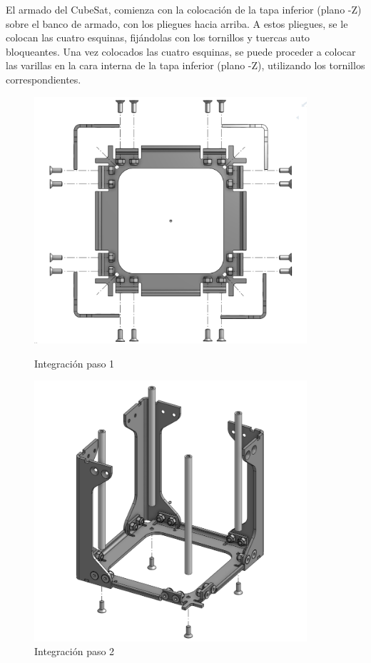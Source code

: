       El armado del CubeSat, comienza con la colocación de la tapa inferior (plano -Z) sobre
      el banco de armado, con los pliegues hacia arriba. A estos pliegues, se le colocan las cuatro
      esquinas, fijándolas con los tornillos y tuercas auto bloqueantes. Una vez colocados las cuatro
      esquinas, se puede proceder a colocar las varillas en la cara interna de la tapa inferior (plano
      -Z), utilizando los tornillos correspondientes.

      \begin{figure}[H]
        \begin{minipage}{0.49\textwidth}
          \centering
          \includegraphics[width=0.9\textwidth]{image/structure/integracion1.png}
          \caption{Integración paso 1}
          \label{fig:integracion1}
        \end{minipage}
        \begin{minipage}{0.49\textwidth}
          \centering
          \includegraphics[width=0.9\textwidth]{image/structure/integracion2.png}
          \caption{Integración paso 2}
          \label{fig:integracion2}
        \end{minipage}
      \end{figure}

